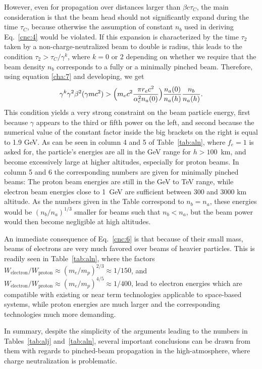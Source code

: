 \documentclass [12pt,a4paper,     ]{report} %
\begin{document}
  
However, even for propagation over distances larger than $\beta c \tau_C$, the main consideration is that the beam head should not significantly expand during the time $\tau_C$, because otherwise the assumption of constant $n_b$ used in deriving Eq.~\eqref{cnc:4} would be violated.  If this expansion is characterized by the time $\tau_2$ taken by a non-charge-neutralized beam to double is radius,  this leads to the condition $\tau_2 > \tau_C/\gamma^k$, where $k=0$ or $2$ depending on whether we require that the beam density $n_b$ corresponds to a fully or a minimally pinched beam.  Therefore, using equation \eqref{cha:7} and developing, we get 
%
\begin{equation}\label{cnc:6} %
   \gamma^k\gamma^2\beta^2(\gamma mc^2)
     > \Bigl(m_ec^2 \frac{\pi r_e c^2}{\alpha_c^2 n_a(0)} \Bigr)
        \frac{n_a(0)}{n_a(h)} \frac{n_b}{n_a(h)}.
\end{equation}
%
This condition yields a very strong constraint on the beam particle energy, first because $\gamma$ appears to the third or fifth power on the left, and second because the numerical value of the constant factor inside the big brackets on the right is equal to 1.9 GeV.  As can be seen in column 4 and 5 of Table~\ref{tab:aln}, where $f_e=1$ is asked for, the particle's energies are all in the GeV range for $h> 100$~km, and become excessively large at higher altitudes, especially for proton beams.  In column 5 and 6 the corresponding numbers are given for minimally pinched beams:  The proton beam energies are still in the GeV to TeV range, while electron beam energies close to 1~GeV are sufficient between 300 and 3000 km altitude.  As the numbers given in the Table correspond to $n_b=n_a$, these energies would be $(n_b/n_a)^{1/3}$ smaller for beams such that $n_b<n_a$, but the beam power would then become negligible at high altitudes.  

  An immediate consequence of Eq.~\eqref{cnc:6} is that because of their small mass, beams of electrons are very much favored over beams of heavier particles.  This is readily seen in Table~\ref{tab:aln}, where the factors $W_{\text{electron}}/W_{\text{proton}} \approx (m_e/m_p)^{2/3} \approx 1/150$, and $W_{\text{electron}}/W_{\text{proton}} \approx (m_e/m_p)^{4/5} \approx 1/400$, lead to electron energies which are compatible with existing or near term technologies applicable to space-based systems, while  proton energies are much larger and the corresponding technologies much more demanding.
 

  In summary, despite the simplicity of the arguments leading to the numbers in Tables~\ref{tab:alj} and~\ref{tab:aln}, several important conclusions can be drawn from them with regards to pinched-beam propagation in the high-atmosphere, where charge neutralization is problematic.
\end{document}
